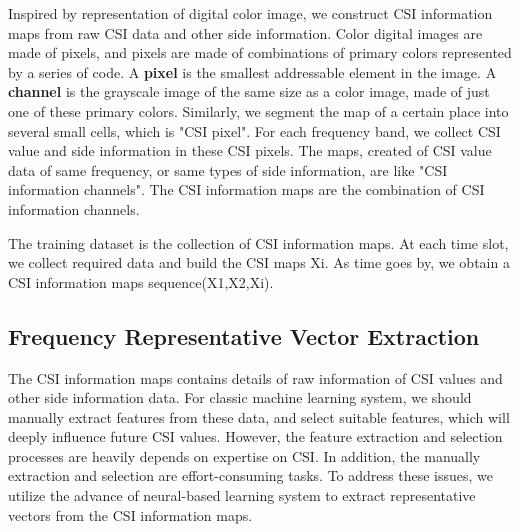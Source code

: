 \documentclass[10pt,conference,letterpaper]{IEEEtran}
\begin{document}
Inspired by representation of digital color image, we construct CSI information maps from raw CSI data and other side information. Color digital images are made of pixels, and pixels are made of combinations of primary colors represented by a series of code. A \textbf{pixel} is the smallest addressable element in the image. A \textbf{channel} is the grayscale image of the same size as a color image, made of just one of these primary colors.  Similarly, we segment the map of a certain place into several small cells, which is "CSI pixel". For each frequency band, we collect CSI value and side information in these CSI pixels. The maps, created of CSI value data of same frequency, or same types of side information, are like "CSI information channels". The CSI information maps are the combination of CSI information channels. 

The training dataset is the collection of CSI information maps. At each time slot, we collect required data and build the CSI maps Xi. As time goes by, we obtain a CSI information maps sequence(X1,X2,Xi).


\subsection{Frequency Representative Vector Extraction}
The CSI information maps contains details of raw information of CSI values and other side information data. For classic machine learning system, we should manually extract features from these data, and select suitable features, which will deeply influence future CSI values. However, the feature extraction and selection processes are heavily depends on expertise on CSI. In addition, the manually extraction and selection are effort-consuming tasks. To address these issues, we utilize the advance of neural-based learning system to extract representative vectors from the CSI information maps.
\end{document}
